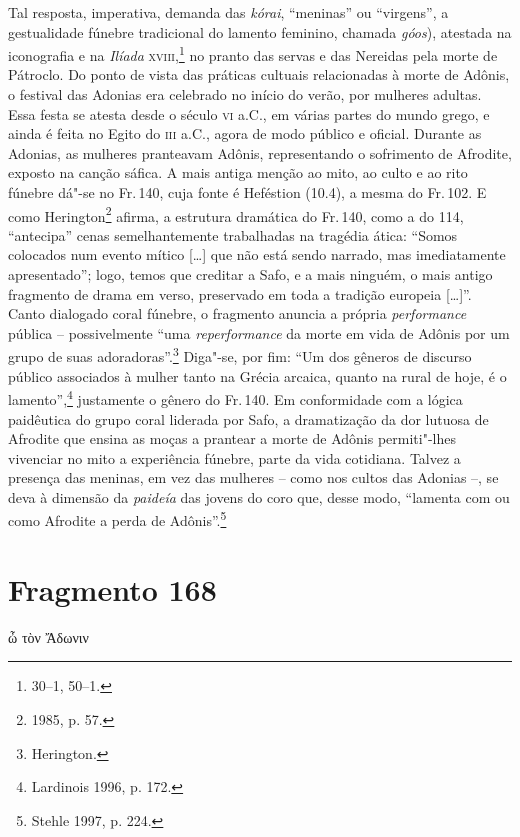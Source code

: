 {\pagebreak
Tal resposta, imperativa, demanda das \textit{kórai}, ``meninas'' ou ``virgens'', a gestualidade fúnebre tradicional do lamento feminino, chamada \textit{góos}), atestada na iconografia e na \textit{Ilíada} \textsc{xviii},\footnote{30--1, 50--1.} no pranto das servas e das Nereidas pela morte de Pátroclo.
Do ponto de vista das práticas cultuais relacionadas à morte de Adônis, o festival das Adonias  
era celebrado no início do verão, por mulheres adultas. Essa festa se atesta 
desde o século \textsc{vi} a.C., em várias partes do
mundo grego, e ainda é feita no Egito do \textsc{iii} a.C., agora de modo público e
oficial. Durante as Adonias, as mulheres pranteavam Adônis, representando o
sofrimento de Afrodite, exposto na canção sáfica. A mais antiga
menção ao mito, ao culto e ao rito fúnebre dá"-se no Fr.\,140, cuja fonte é
Heféstion (10.4), a mesma do Fr.\,102. E como Herington\footnote{1985, p. 57.} afirma, a estrutura dramática do Fr.\,140,  como a do 114, ``antecipa'' cenas semelhantemente trabalhadas na tragédia ática: ``Somos colocados num evento mítico [\ldots{}] que não está sendo narrado, mas imediatamente apresentado''; logo,  temos que creditar a Safo, e a mais ninguém, o mais antigo fragmento de drama em verso, preservado em toda a tradição europeia [\ldots{}]''. Canto dialogado coral fúnebre, o fragmento anuncia a própria \textit{performance} pública -- possivelmente ``uma \textit{reperformance} da morte em vida de Adônis por um grupo de suas adoradoras''.\footnote{Herington.} Diga"-se, por fim: ``Um dos gêneros de discurso público associados à mulher tanto na Grécia arcaica, quanto na rural de hoje, é o lamento'',\footnote{Lardinois 1996, p. 172.} justamente o gênero do Fr.\,140. Em conformidade com a lógica
paidêutica do grupo coral liderada por Safo, a dramatização da dor lutuosa de Afrodite que ensina as moças a prantear a morte de Adônis permiti"-lhes vivenciar no mito a experiência fúnebre, parte da vida cotidiana. Talvez a presença das meninas, em vez das mulheres -- como nos cultos das Adonias --, se deva à dimensão da \textit{paideía} das jovens do coro que, desse modo, ``lamenta com ou como Afrodite a perda de Adônis''.\footnote{Stehle 1997, p. 224.}}

\section{Fragmento 168}

\begin{gkverse}
ὦ τὸν Ἄδωνιν
\end{gkverse}


